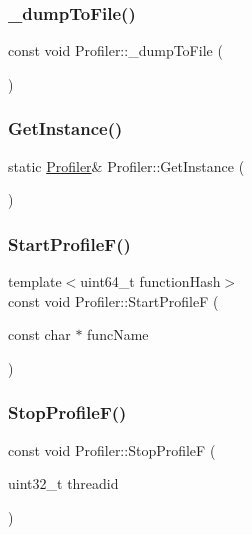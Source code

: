 \subsubsection{\texorpdfstring{\+\_\+dump\+To\+File()}{\_dumpToFile()}}
{\footnotesize\ttfamily const void Profiler\+::\+\_\+dump\+To\+File (\begin{DoxyParamCaption}{ }\end{DoxyParamCaption})}

\mbox{\label{class_profiler_af260850db5b9767c969973090c845ab4}} 
\subsubsection{\texorpdfstring{Get\+Instance()}{GetInstance()}}
{\footnotesize\ttfamily static \hyperlink{class_profiler}{Profiler}\& Profiler\+::\+Get\+Instance (\begin{DoxyParamCaption}{ }\end{DoxyParamCaption})\hspace{0.3cm}{\ttfamily [static]}}

\mbox{\label{class_profiler_a1d9623c49b247e4b8374dd991d489f45}} 
\subsubsection{\texorpdfstring{Start\+Profile\+F()}{StartProfileF()}}
{\footnotesize\ttfamily template$<$uint64\+\_\+t function\+Hash$>$ \\
const void Profiler\+::\+Start\+ProfileF (\begin{DoxyParamCaption}\item[{const char $\ast$}]{func\+Name }\end{DoxyParamCaption})\hspace{0.3cm}{\ttfamily [inline]}}

\mbox{\label{class_profiler_a6f9e7815c9d08f33ec89f3aedbb85694}} 
\subsubsection{\texorpdfstring{Stop\+Profile\+F()}{StopProfileF()}}
{\footnotesize\ttfamily const void Profiler\+::\+Stop\+ProfileF (\begin{DoxyParamCaption}\item[{uint32\+\_\+t}]{threadid }\end{DoxyParamCaption})}



